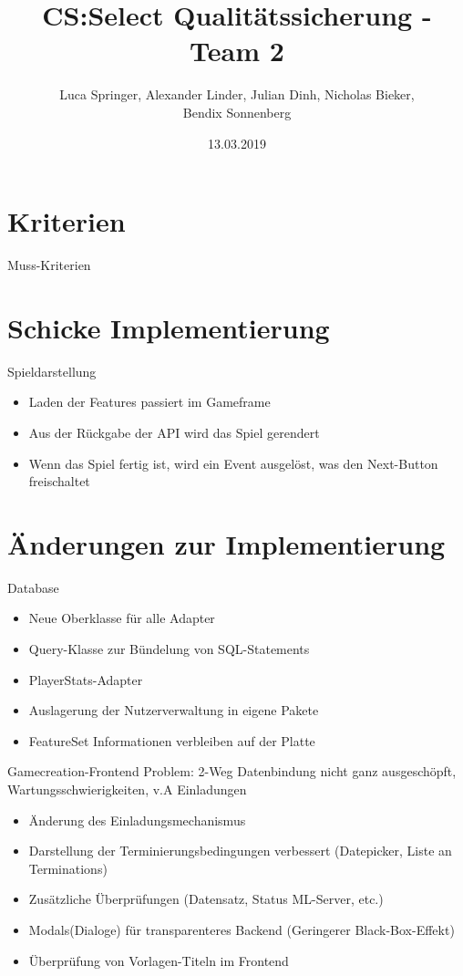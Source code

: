 \documentclass[xcolor=dvipsnames]{beamer}
\title[Team 2 - Implementierung]{CS:Select Qualitätssicherung - Team 2}
\author{Luca Springer, Alexander Linder, Julian Dinh, Nicholas Bieker,\\ Bendix Sonnenberg}
\date{13.03.2019}
\begin{document}
\begin{frame} %
  \titlepage
\end{frame}

\section{Kriterien}

\begin{frame}{Muss-Kriterien}

\end{frame}

\section{Schicke Implementierung}
\begin{frame}{Spieldarstellung}
\begin{itemize}
    \item Laden der Features passiert im Gameframe
    \item Aus der Rückgabe der API wird das Spiel gerendert
    \item Wenn das Spiel fertig ist, wird ein Event ausgelöst, was den Next-Button freischaltet
\end{itemize}
\end{frame}

\section{Änderungen zur Implementierung}
\begin{frame}{Database}
    \begin{itemize}
        \item Neue Oberklasse für alle Adapter
        \item Query-Klasse zur Bündelung von SQL-Statements
        \item PlayerStats-Adapter
        \item Auslagerung der Nutzerverwaltung in eigene Pakete
        \item FeatureSet Informationen verbleiben auf der Platte
    \end{itemize}
\end{frame}
\begin{frame}{Gamecreation-Frontend}
    Problem: 2-Weg Datenbindung nicht ganz ausgeschöpft, Wartungsschwierigkeiten, v.A Einladungen
    \begin{itemize}
        \item Änderung des Einladungsmechanismus
        \item Darstellung der Terminierungsbedingungen verbessert (Datepicker, Liste an Terminations)
        \item Zusätzliche Überprüfungen (Datensatz, Status ML-Server, etc.)
        \item Modals(Dialoge) für transparenteres Backend (Geringerer Black-Box-Effekt)
        \item Überprüfung von Vorlagen-Titeln im Frontend
    \end{itemize}
\end{frame}
\end{document}
